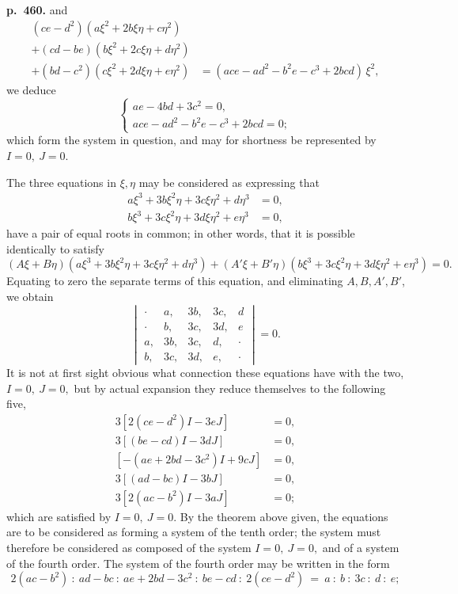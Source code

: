 \documentclass[11pt]{article}
\begin{document}
\bigskip
\noindent\textbf{p.~460.} and
\[
\begin{aligned}
(ce - d^2)(a\xi^2 + 2b\xi\eta + c\eta^2) &\\
+ (cd - be)(b\xi^2 + 2c\xi\eta + d\eta^2) &\\
+ (bd - c^2)(c\xi^2 + 2d\xi\eta + e\eta^2) &= (ace - ad^2 - b^2 e - c^3 + 2bcd)\,\xi^2,
\end{aligned}
\]
we deduce
\[
\begin{cases}
ae - 4bd + 3c^2 = 0,\\
ace - ad^2 - b^2 e - c^3 + 2bcd = 0;
\end{cases}
\]
which form the system in question, and may for shortness be represented by $I = 0,\ J = 0$.

The three equations in $\xi, \eta$ may be considered as expressing that
\[
\begin{aligned}
a\xi^3 + 3b\xi^2\eta + 3c\xi\eta^2 + d\eta^3 &= 0,\\
b\xi^3 + 3c\xi^2\eta + 3d\xi\eta^2 + e\eta^3 &= 0,
\end{aligned}
\]
have a pair of equal roots in common; in other words, that it is possible identically to satisfy
\[ (A\xi + B\eta)(a\xi^3 + 3b\xi^2\eta + 3c\xi\eta^2 + d\eta^3) + (A'\xi + B'\eta)(b\xi^3 + 3c\xi^2\eta + 3d\xi\eta^2 + e\eta^3) = 0. \]
Equating to zero the separate terms of this equation, and eliminating $A, B, A', B'$, we obtain
\[ \begin{vmatrix} \cdot & a, & 3b, & 3c, & d\\ \cdot & b, & 3c, & 3d, & e\\ a, & 3b, & 3c, & d, & \cdot\\ b, & 3c, & 3d, & e, & \cdot \end{vmatrix} = 0. \]
It is not at first sight obvious what connection these equations have with the two, $I = 0,\ J = 0,$ but by actual expansion they reduce themselves to the following five,
\[
\begin{aligned}
3[2(ce - d^2)I - 3eJ] &= 0,\\
3[(be - cd)I - 3dJ] &= 0,\\
[-(ae + 2bd - 3c^2)I + 9cJ] &= 0,\\
3[(ad - bc)I - 3bJ] &= 0,\\
3[2(ac - b^2)I - 3aJ] &= 0;
\end{aligned}
\]
which are satisfied by $I = 0,\ J = 0$. By the theorem above given, the equations are to be considered as forming a system of the tenth order; the system must therefore be considered as composed of the system $I = 0,\ J = 0,$ and of a system of the fourth order. The system of the fourth order may be written in the form
\[ 2(ac - b^2)\ :\ ad - bc\ :\ ae + 2bd - 3c^2\ :\ be - cd\ :\ 2(ce - d^2)\ =\ a\ :\ b\ :\ 3c\ :\ d\ :\ e; \]
\end{document}
